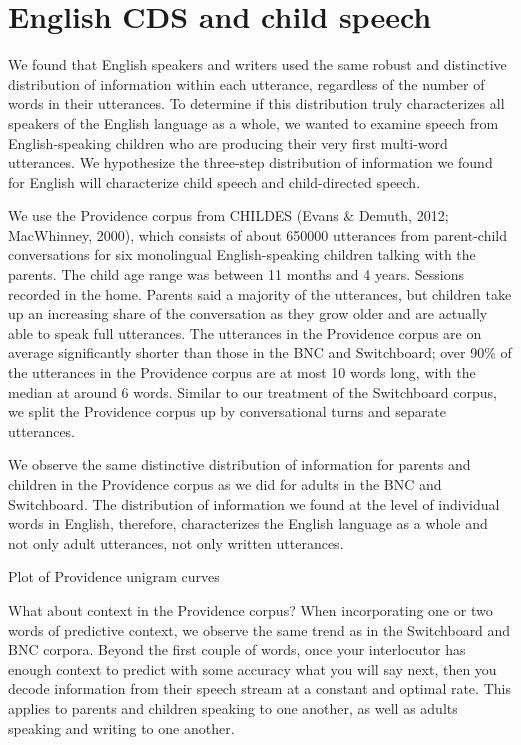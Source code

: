 \documentclass[11pt,]{article}
\begin{document}
\hypertarget{english-cds-and-child-speech}{%
\section{English CDS and child speech}\label{english-cds-and-child-speech}}

We found that English speakers and writers used the same robust and distinctive distribution of information within each utterance, regardless of the number of words in their utterances. To determine if this distribution truly characterizes all speakers of the English language as a whole, we wanted to examine speech from English-speaking children who are producing their very first multi-word utterances. We hypothesize the three-step distribution of information we found for English will characterize child speech and child-directed speech.

We use the Providence corpus from CHILDES (Evans \& Demuth, 2012; MacWhinney, 2000), which consists of about 650000 utterances from parent-child conversations for six monolingual English-speaking children talking with the parents. The child age range was between 11 months and 4 years. Sessions recorded in the home. Parents said a majority of the utterances, but children take up an increasing share of the conversation as they grow older and are actually able to speak full utterances. The utterances in the Providence corpus are on average significantly shorter than those in the BNC and Switchboard; over 90\% of the utterances in the Providence corpus are at most 10 words long, with the median at around 6 words. Similar to our treatment of the Switchboard corpus, we split the Providence corpus up by conversational turns and separate utterances.

We observe the same distinctive distribution of information for parents and children in the Providence corpus as we did for adults in the BNC and Switchboard. The distribution of information we found at the level of individual words in English, therefore, characterizes the English language as a whole and not only adult utterances, not only written utterances.

Plot of Providence unigram curves

What about context in the Providence corpus? When incorporating one or two words of predictive context, we observe the same trend as in the Switchboard and BNC corpora. Beyond the first couple of words, once your interlocutor has enough context to predict with some accuracy what you will say next, then you decode information from their speech stream at a constant and optimal rate. This applies to parents and children speaking to one another, as well as adults speaking and writing to one another.
\end{document}
